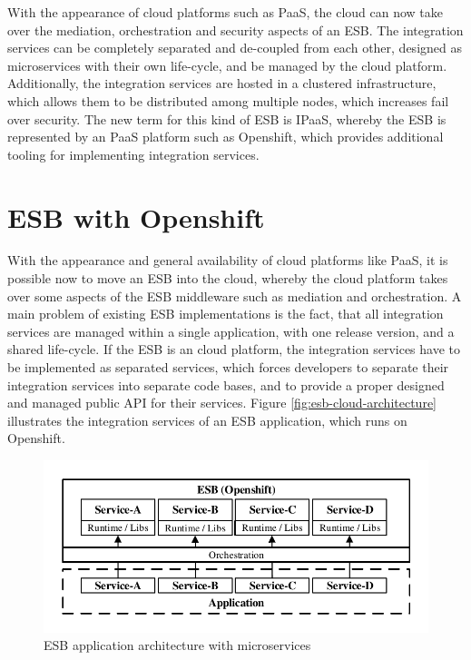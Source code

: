 With the appearance of cloud platforms such as PaaS, the cloud can now take over the mediation, orchestration and security aspects of an ESB. The integration services can be completely separated and de-coupled from each other, designed as microservices with their own life-cycle, and be managed by the cloud platform. Additionally, the integration services are hosted in a clustered infrastructure, which allows them to be distributed among multiple nodes, which increases fail over security. The new term for this kind of ESB is IPaaS, whereby the ESB is represented by an PaaS platform such as Openshift, which provides additional tooling for implementing integration services\cite{iPaaSP12015, iPaaSP22015}.

\section{ESB with Openshift}
\label{sec:esb-as-cloud}
With the appearance and general availability of cloud platforms like PaaS, it is possible now to move an ESB into the cloud, whereby the cloud platform takes over some aspects of the ESB middleware such as mediation and orchestration. A main problem of existing ESB implementations is the fact, that all integration services are managed within a single application, with one release version, and a shared life-cycle. If the ESB is an cloud platform, the integration services have to be implemented as separated services, which forces developers to separate their integration services into separate code bases, and to provide a proper designed and managed public API for their services. Figure \vref{fig:esb-cloud-architecture} illustrates the integration services of an ESB application, which runs on Openshift.

\begin{figure}[htbp]
	\centering
	\includegraphics[scale=1]{images/esb-cloud-architecture.pdf}
	\caption{ESB application architecture with microservices}
	\label{fig:esb-cloud-architecture}
\end{figure} 

